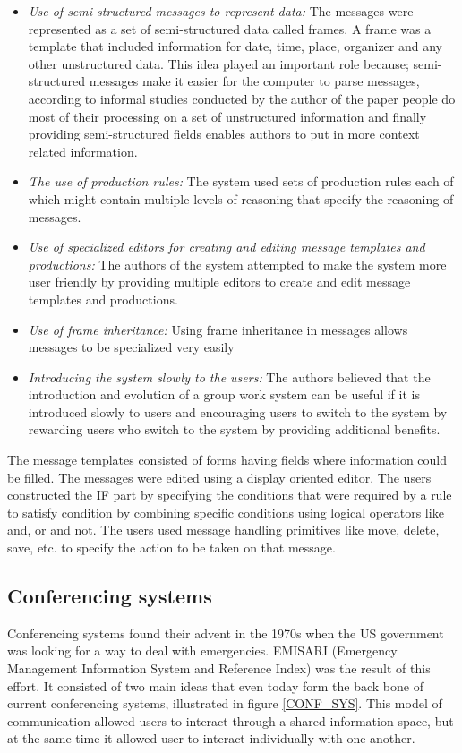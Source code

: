 \begin{itemize} 
  \item \emph{ Use of semi-structured messages to represent data:} The messages were represented as a set of semi-structured data
  called frames. A frame was a template that included information for
  date, time, place, organizer and any other unstructured data. This
  idea played an important role because; semi-structured messages make
  it easier for the computer to parse messages, according to informal
  studies conducted by the author of the paper\cite{Malo87a} people do
  most of their processing on a set of unstructured information and
  finally providing semi-structured fields enables authors to put in
  more context related information.

\item \emph{The use of production rules:} The system used sets of
  production rules each of which might contain multiple levels of
  reasoning that specify the reasoning of messages.

\item \emph{Use of specialized editors for creating and editing
    message templates and productions: } The authors of the system
  attempted to make the system more user friendly by providing
  multiple editors to create and edit message templates and
  productions.
\item \emph{Use of frame inheritance:} Using frame inheritance in
  messages allows messages to be specialized very easily
\item \emph{Introducing the system slowly to the users:} The authors
  believed that the introduction and evolution of a group work system
  can be useful if it is introduced slowly to users and encouraging
  users to switch to the system by rewarding users who switch to the
  system by providing additional benefits.
\end{itemize}

The message templates consisted of forms having fields where
information could be filled. The messages were edited using a display
oriented editor. The users constructed the IF part by specifying the
conditions that were required by a rule to satisfy condition by
combining specific conditions using logical operators like and, or and
not. The users used message handling primitives like move, delete,
save, etc. to specify the action to be taken on that message.

\subsection{Conferencing systems}
Conferencing systems found their advent in the 1970s when the US
government was looking for a way to deal with emergencies. EMISARI\cite{Hilt78a}
(Emergency Management Information System and Reference Index) was
the result of this effort. It consisted of two main ideas that even
today form the back bone of current conferencing systems, illustrated
in figure \ref{CONF_SYS}. This model
of communication allowed users to interact through a shared
information space, but at the same time it allowed user to interact
individually with one another. 

